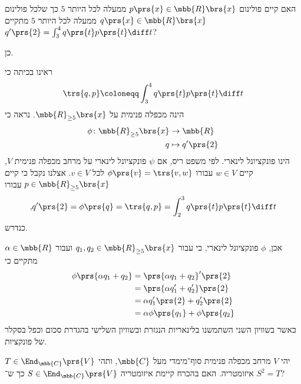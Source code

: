 \documentclass[a4paper,10pt,twoside,openany]{article}
\begin{document}
\setcounter{exercise}{7}

\newpage

\begin{exercise}
האם קיים פולינום
$p\prs{x} \in \mbb{R}\brs{x}$
ממעלה לכל היותר
$5$
כך שלכל פולינום
$q\prs{x} \in \mbb{R}\brs{x}$
ממעלה לכל היותר
$5$
מתקיים
$q'\prs{2} = \int_3^4 q\prs{t} p\prs{t} \diff t$?
\end{exercise}

\begin{solution}
כן.

ראינו בכיתה כי
\[\trs{q, p} \coloneqq \int_3^4 q\prs{t} p\prs{t} \diff t\]
הינה מכפלה פנימית על
$\mbb{R}_{\geq 5}\brs{x}$.
נראה כי
\begin{align*}
\phi \colon \mbb{R}_{\geq 5}\brs{x} &\to \mbb{R} \\
q &\mapsto q'\prs{2}
\end{align*}
הינו פונקציונל לינארי. לפי משפט ריס, אם
$\psi$
פונקציונל לינארי על מרחב מכפלה פנימית
$V$,
קיים
$w \in V$
עבורו
$\phi\prs{v} = \trs{v, w}$
לכל
$v \in V$.
אצלנו נקבל כי קיים
$p \in \mbb{R}_{\geq 5}\brs{x}$
עבורו
\[\text{,} q'\prs{2} = \phi\prs{q} = \trs{q, p} = \int_2^3 q\prs{t} p\prs{t} \diff t\]
כנדרש.

אכן,
$\phi$
פונקציונל לינארי, כי עבור
$q_1, q_2 \in \mbb{R}_{\geq 5}\brs{x}$
ועבור
$\alpha \in \mbb{R}$
מתקיים כי
\begin{align*}
\phi\prs{\alpha q_1 + q_2} &= \prs{\alpha q_1 + q_2}' \prs{2}
\\&= \prs{\alpha q_1' + q_2'} \prs{2}
\\&= \alpha q_1'\prs{2} + q_2'\prs{2}
\\&= \alpha \phi\prs{q_1} + \phi\prs{q_2}
\end{align*}
כאשר בשוויון השני השתמשנו בלינאריות הנגזרת ובשוויון השלישי בהגדרת סכום וכפל בסקלר של פונקציות.
\end{solution}

\newpage

\begin{exercise}
יהי
$V$
מרחב מכפלה פנימית סוף־מימדי מעל
$\mbb{C}$,
ותהי
$T \in \End_{\mbb{C}}\prs{V}$
איזומטריה. האם בהכרח קיימת איזומטריה
$S \in \End_{\mbb{C}}\prs{V}$
כך ש־%
$S^2 = T$?
\end{exercise}
\end{document}
